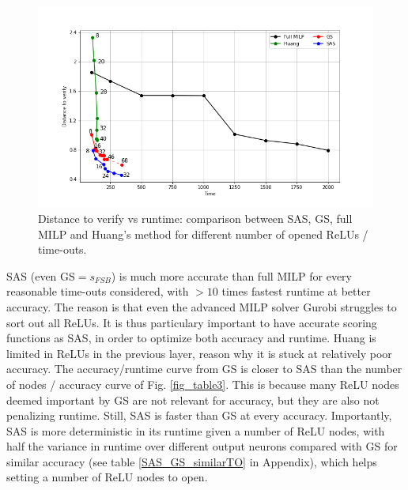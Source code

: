 \begin{figure}[t!]
	\hspace*{-0.8cm}
	\includegraphics[scale=0.5]{CNN-B-ADV_layer7_comparison_image85_4methods.png}
	\caption{Distance to verify vs runtime: comparison between {\sf SAS}, GS, full MILP and Huang's method for different number of opened ReLUs / time-outs.}
	\label{fig555}
\end{figure}

{\sf SAS} (even {\sf GS}$=s_{FSB}$) is much more accurate than full MILP for every reasonable time-outs considered, with $>10$ times fastest runtime at better accuracy. The reason is that even the advanced MILP solver Gurobi struggles to sort out all ReLUs. It is thus particulary important to have accurate scoring functions as {\sf SAS}, in order to optimize both accuracy and runtime. Huang \cite{DivideAndSlide} is limited in ReLUs in the previous layer, reason why it is stuck at relatively poor accuracy. The accuracy/runtime curve from {\sf GS} is closer to {\sf SAS} than the number of nodes / accuracy curve of Fig. \ref{fig_table3}. This is because many ReLU nodes deemed important by {\sf GS} are not relevant for accuracy, but they are also not penalizing runtime. Still, {\sf SAS} is faster than {\sf GS} at  every accuracy. Importantly, {\sf SAS} is more deterministic in its runtime given a number of ReLU nodes, with half the variance in runtime over different output neurons compared with {\sf GS} for similar accuracy (see table \ref{SAS_GS_similarTO} in Appendix), which helps setting a number of ReLU nodes to open.





